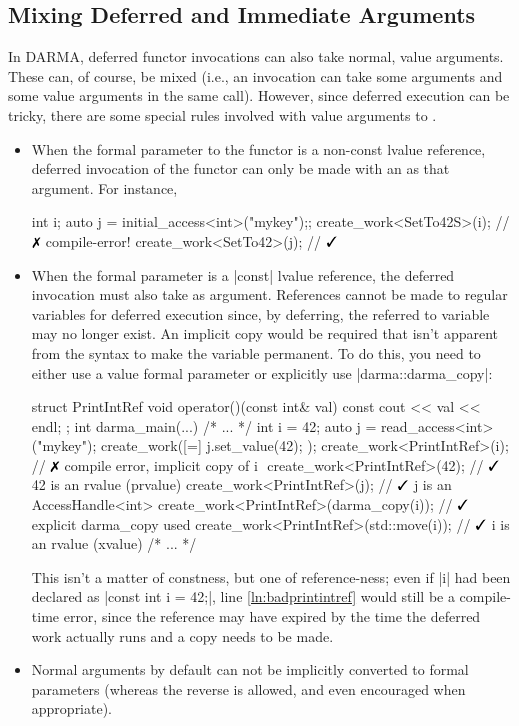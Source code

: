 \subsection{Mixing Deferred and Immediate Arguments}
In \gls{DARMA}, deferred functor invocations can also take normal, value arguments. 
These can, of course, be mixed (i.e., an invocation can take some
 arguments and some value arguments in the same call).  However,
since \gls{deferred execution} can be tricky, there are some special rules involved
with value arguments to .
\begin{itemize}
  \item When the formal parameter to the functor is a non-const lvalue
  reference, deferred invocation of the functor can only be made
  with an  as that argument.  For instance,
\begin{CppCodeNumb}
int i;
auto j = initial_access<int>("mykey");;
create_work<SetTo42S>(i); // $\no$ compile-error!
create_work<SetTo42>(j); // $\yes$
\end{CppCodeNumb}
  \item When the formal parameter is a |const| lvalue reference, the deferred
    invocation must also take  as argument.  
    References cannot be made to regular \CC{} variables for \gls{deferred
    execution} since, by deferring,
  the referred to variable may no longer exist.
  An implicit copy would be required that isn't apparent from the syntax to make the variable permanent.  
  To do this, you need to either use a value formal parameter or explicitly use
|darma::darma_copy|:
\begin{CppCodeNumb}
struct PrintIntRef {
  void operator()(const int& val) const { cout << val << endl; }
};
int darma_main(...) {
  /* ... */
  int i = 42;
  auto j = read_access<int>("mykey");
  create_work([=]{ j.set_value(42); });
  create_work<PrintIntRef>(i); // $\no$ compile error, implicit copy of i $\label{ln:badprintintref}$
  create_work<PrintIntRef>(42); // $\yes$ 42 is an rvalue (prvalue)
  create_work<PrintIntRef>(j); // $\yes$ j is an AccessHandle<int>
  create_work<PrintIntRef>(darma_copy(i)); // $\yes$ explicit darma_copy used
  create_work<PrintIntRef>(std::move(i)); // $\yes$ i is an rvalue (xvalue)
  /* ... */
}
\end{CppCodeNumb}
  This isn't a matter of constness, but one of reference-ness; even if |i| had
  been declared as |const int i = 42;|, line \ref{ln:badprintintref} would still
  be a compile-time error, since the reference may have expired by the time the
  \gls{deferred work} actually runs and a copy needs to be made.
\item Normal arguments by default can not be implicitly converted to  formal
  parameters (whereas the reverse is allowed, and even encouraged when appropriate).
\end{itemize}


